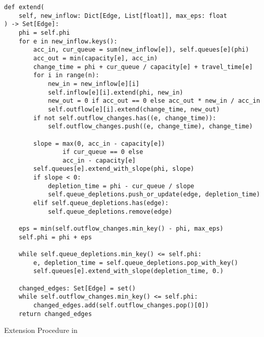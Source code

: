 \begin{algorithm}

    \begin{verbatim}
def extend(
    self, new_inflow: Dict[Edge, List[float]], max_eps: float
) -> Set[Edge]:
    phi = self.phi
    for e in new_inflow.keys():
        acc_in, cur_queue = sum(new_inflow[e]), self.queues[e](phi)
        acc_out = min(capacity[e], acc_in)
        change_time = phi + cur_queue / capacity[e] + travel_time[e]
        for i in range(n):
            new_in = new_inflow[e][i]
            self.inflow[e][i].extend(phi, new_in)
            new_out = 0 if acc_out == 0 else acc_out * new_in / acc_in
            self.outflow[e][i].extend(change_time, new_out)
        if not self.outflow_changes.has((e, change_time)):
            self.outflow_changes.push((e, change_time), change_time)
        
        slope = max(0, acc_in - capacity[e])
                if cur_queue == 0 else
                acc_in - capacity[e]
        self.queues[e].extend_with_slope(phi, slope)
        if slope < 0:
            depletion_time = phi - cur_queue / slope
            self.queue_depletions.push_or_update(edge, depletion_time)
        elif self.queue_depletions.has(edge):
            self.queue_depletions.remove(edge)

    eps = min(self.outflow_changes.min_key() - phi, max_eps)
    self.phi = phi + eps

    while self.queue_depletions.min_key() <= self.phi:
        e, depletion_time = self.queue_depletions.pop_with_key()
        self.queues[e].extend_with_slope(depletion_time, 0.)
    
    changed_edges: Set[Edge] = set()
    while self.outflow_changes.min_key() <= self.phi:
        changed_edges.add(self.outflow_changes.pop()[0])
    return changed_edges
    \end{verbatim}
    \caption{Extension Procedure in }
\end{algorithm}

